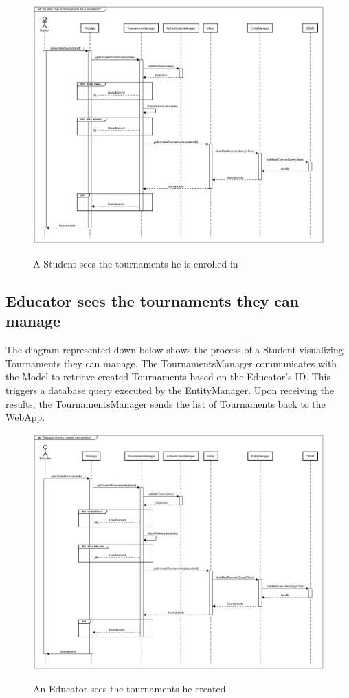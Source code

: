 \documentclass{Configuration_Files/Template}
\begin{document}
\begin{figure}[H]
\centering
\includegraphics[scale = 0.33]{Images/diagrams/sequences/GetEnrolledTournaments.png}\\
\caption{A Student sees the tournaments he is enrolled in }
\end{figure}

\subsection*{Educator sees the tournaments they can manage}

The diagram represented down below shows the process of a Student visualizing Tournaments they can manage. The TournamentsManager communicates with the Model to retrieve created Tournaments based on the Educator's ID. This triggers a database query executed by the EntityManager. Upon receiving the results, the TournamentsManager sends the list of Tournaments back to the WebApp.

\begin{figure}[H]
\centering
\includegraphics[scale = 0.33]{Images/diagrams/sequences/GetCreatedTournaments.png}\\
\caption{An Educator sees the tournaments he created}
\end{figure}
\end{document}
